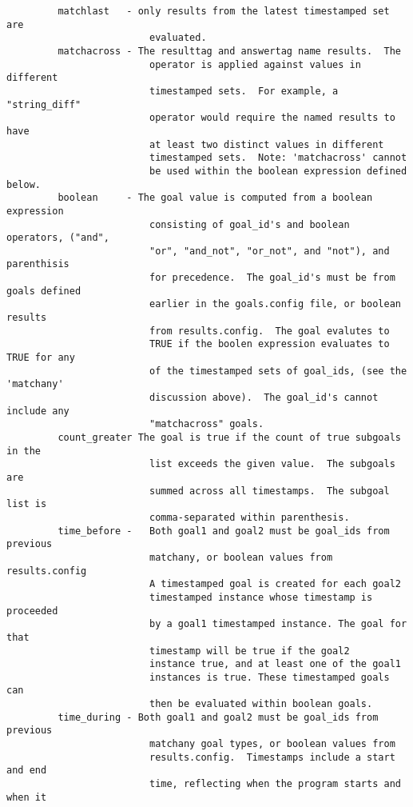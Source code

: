 \documentclass[12pt]{article}
\begin{document}
\begin{verbatim}
         matchlast   - only results from the latest timestamped set are 
                         evaluated.
         matchacross - The resulttag and answertag name results.  The 
                         operator is applied against values in different 
                         timestamped sets.  For example, a "string_diff" 
                         operator would require the named results to have 
                         at least two distinct values in different 
                         timestamped sets.  Note: 'matchacross' cannot 
                         be used within the boolean expression defined below.
         boolean     - The goal value is computed from a boolean expression 
                         consisting of goal_id's and boolean operators, ("and", 
                         "or", "and_not", "or_not", and "not"), and parenthisis 
                         for precedence.  The goal_id's must be from goals defined 
                         earlier in the goals.config file, or boolean results
                         from results.config.  The goal evalutes to 
                         TRUE if the boolen expression evaluates to TRUE for any
                         of the timestamped sets of goal_ids, (see the 'matchany' 
                         discussion above).  The goal_id's cannot include any 
                         "matchacross" goals.
         count_greater The goal is true if the count of true subgoals in the 
                         list exceeds the given value.  The subgoals are 
                         summed across all timestamps.  The subgoal list is 
                         comma-separated within parenthesis.
         time_before -   Both goal1 and goal2 must be goal_ids from previous 
                         matchany, or boolean values from results.config
                         A timestamped goal is created for each goal2 
                         timestamped instance whose timestamp is proceeded 
                         by a goal1 timestamped instance. The goal for that
                         timestamp will be true if the goal2
                         instance true, and at least one of the goal1
                         instances is true. These timestamped goals can
                         then be evaluated within boolean goals.
         time_during - Both goal1 and goal2 must be goal_ids from previous 
                         matchany goal types, or boolean values from 
                         results.config.  Timestamps include a start and end 
                         time, reflecting when the program starts and when it 

\end{verbatim}
\end{document}
